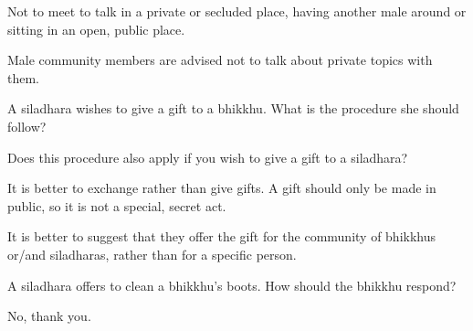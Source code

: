 \begin{solution}
  Not to meet to talk in a private or secluded place,
  having another male around or sitting in an open, public place.

  Male community members are advised not to talk about private topics with them.
\end{solution}

\bigskip

A siladhara wishes to give a gift to a bhikkhu. What is the procedure she should follow?

\bigskip

Does this procedure also apply if you wish to give a gift to a siladhara?

\begin{solution}
  It is better to exchange rather than give gifts.
  A gift should only be made in public, so it is not a special, secret act.

  It is better to suggest that they offer the gift for the community of bhikkhus or/and siladharas,
  rather than for a specific person.
\end{solution}

\bigskip

A siladhara offers to clean a bhikkhu's boots. How should the bhikkhu respond?

\begin{solution}
  No, thank you.
\end{solution}

